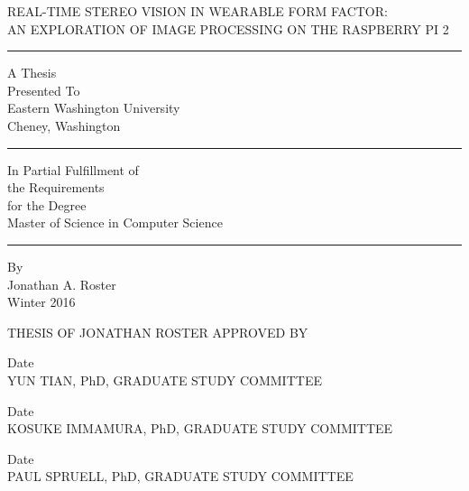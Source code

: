 \documentclass[chapterprefix=false, 12pt]{scrreprt}
\begin{document}
\doublespace
\thispagestyle{empty}
\begin{center}
	REAL-TIME STEREO VISION IN WEARABLE FORM FACTOR:\\ AN EXPLORATION OF IMAGE PROCESSING ON THE RASPBERRY PI 2
\end{center}
\hrule
\begin{center}
	A Thesis\\
	Presented To\\
	Eastern Washington University\\
	Cheney, Washington\\
\end{center}
\hrule
\begin{center}
	In Partial Fulfillment of \\
	the Requirements\\
	for the Degree \\
	Master of Science in Computer Science\\
\end{center}
	\hrule
\begin{center}
	By \\
	Jonathan A. Roster\\
	Winter 2016
\end{center}
\newpage
\vspace{.75in}
\begin{center}
THESIS OF JONATHAN ROSTER APPROVED BY
\end{center}
\vspace{1.5in}
\begin{center}
\makebox[3in]{\hrulefill} Date\makebox[1.0in]{\hrulefill}\\
YUN TIAN, PhD, GRADUATE STUDY COMMITTEE

\vspace{.75in}

\makebox[3in]{\hrulefill} Date\makebox[1.0in]{\hrulefill}\\
KOSUKE IMMAMURA, PhD, GRADUATE STUDY COMMITTEE

\vspace{.75in}

\makebox[3in]{\hrulefill} Date\makebox[1.0in]{\hrulefill}\\
PAUL SPRUELL, PhD, GRADUATE STUDY COMMITTEE
\end{center}
\end{document}
